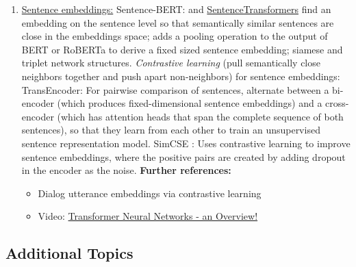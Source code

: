 \documentclass[11pt, a4paper]{amsart}
\begin{document}
\begin{enumerate}[resume]
    \item \underline{Sentence embeddings:}
    \newline
    Sentence-BERT: \cite{DBLP:journals/corr/abs-1908-10084} and \href{https://www.sbert.net/}{SentenceTransformers}
    find an embedding on the sentence level so that semantically similar sentences are close in the embeddings space;
    adds a pooling operation to the output of BERT or RoBERTa to derive a fixed sized sentence embedding;
    siamese and triplet network structures.
    \newline
    \emph{Contrastive learning} (pull semantically close neighbors together and push apart non-neighbors) for sentence embeddings:
    \newline
    TransEncoder: For pairwise comparison of sentences, \cite{DBLP:journals/corr/abs-2109-13059} alternate between a bi-encoder (which produces fixed-dimensional sentence embeddings) and a cross-encoder (which has attention heads that span the complete sequence of both sentences), so that they learn from each other to train an unsupervised sentence representation model.
    \newline
    SimCSE \cite{DBLP:journals/corr/abs-2104-08821}: Uses contrastive learning to improve sentence embeddings, where the positive pairs are created by adding dropout in the encoder as the noise.
    \newline
    \textbf{Further references:}
    \begin{itemize}
        \item Dialog utterance embeddings via contrastive learning \cite{https://doi.org/10.48550/arxiv.2205.13568}
        \item Video: \href{https://youtu.be/O3xbVmpdJwU}{Transformer Neural Networks - an Overview!}
    \end{itemize}
\end{enumerate}

\subsection{Additional Topics}
\end{document}

